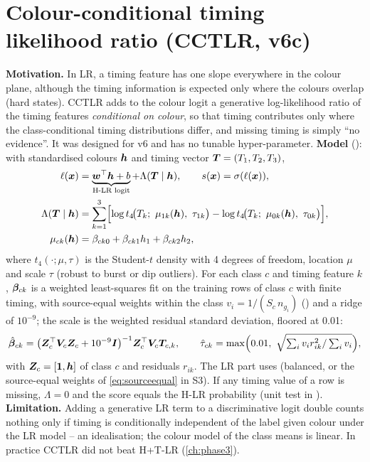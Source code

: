 \section{Colour-conditional timing likelihood ratio (CCTLR, v6c)}\label{sec:cctlr}
\textbf{Motivation.} In LR, a timing feature has one slope everywhere in the colour plane, although the timing information
is expected only where the colours overlap (hard states). CCTLR adds to the colour logit a generative log-likelihood ratio
of the timing features \emph{conditional on colour}, so that timing contributes only where the class-conditional timing
distributions differ, and missing timing is simply ``no evidence''. It was designed for v6 and has no tunable
hyper-parameter. \textbf{Model} (): with standardised colours $\bm{h}$ and timing vector
$\bm{T}=(T_1,T_2,T_3)$,
\begin{align}
\ell(\bm{x}) &= \underbrace{\bm{w}^\top\bm{h} + b}_{\text{H-LR logit}} + \Lambda(\bm{T}\mid\bm{h}),\qquad s(\bm{x})=\sigma(\ell(\bm{x})),\label{eq:cctlr}\\
\Lambda(\bm{T}\mid\bm{h}) &= \sum_{k=1}^{3}\Bigl[\log t_4\!\bigl(T_k;\ \mu_{1k}(\bm{h}),\ \tau_{1k}\bigr)-\log t_4\!\bigl(T_k;\ \mu_{0k}(\bm{h}),\ \tau_{0k}\bigr)\Bigr], \nonumber\\
\mu_{ck}(\bm{h}) &= \beta_{ck0}+\beta_{ck1}h_1+\beta_{ck2}h_2, \nonumber
\end{align}
where $t_4(\cdot;\mu,\tau)$ is the Student-$t$ density with 4 degrees of freedom, location $\mu$ and scale $\tau$ (robust to
burst or dip outliers). For each class $c$ and timing feature $k$, $\bm{\beta}_{ck}$ is a weighted least-squares fit on
the training rows of class $c$ with finite timing, with source-equal weights within the class
$v_i = 1/(S_c\,n_{g_i})$ () and a ridge of $10^{-9}$; the scale is the weighted
residual standard deviation, floored at 0.01:
\begin{equation}
\hat{\vect\beta}_{ck}=\bigl(\vect Z_c^\top\vect V_c\vect Z_c+10^{-9}\vect I\bigr)^{-1}\vect Z_c^\top\vect V_c\vect T_{c,k},\qquad
\hat\tau_{ck}=\max\Bigl(0.01,\ \sqrt{\textstyle\sum_iv_ir_{ik}^2/\sum_iv_i}\Bigr),\label{eq:cctlrfit}
\end{equation}
with $\bm{Z}_c=[\bm{1},\bm{h}]$ of class $c$ and residuals $r_{ik}$. The LR part uses  (balanced, or the
source-equal weights of \cref{eq:sourceequal} in S3). If any timing value of a row is missing, $\Lambda=0$ and the score
equals the H-LR probability (unit test in ). \textbf{Limitation.} Adding a generative LR term to a
discriminative logit double counts nothing only if timing is conditionally independent of the label given colour under
the LR model -- an idealisation; the colour model of the class means is linear. In practice CCTLR did not beat H+T-LR
(\cref{ch:phase3}).

